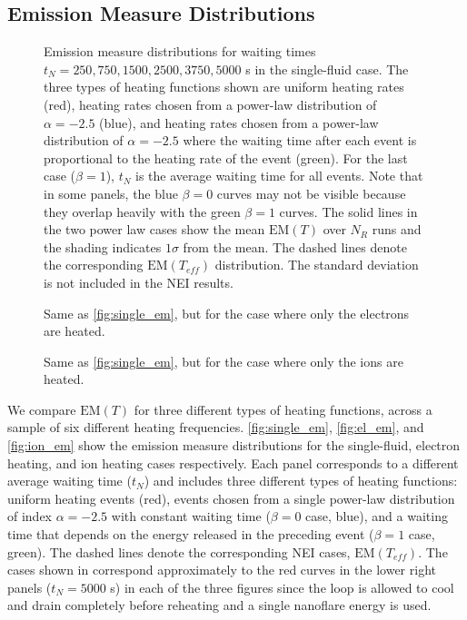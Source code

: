 \documentclass[preprint,linenumbers]{aastex}
\begin{document}
	\subsection{Emission Measure Distributions}
	\label{subsec:em_dist}
	\begin{figure*}[t]
		\caption{Emission measure distributions for waiting times $t_N=250,750,1500,2500,3750,5000$ s in the single-fluid case. The three types of heating functions shown are uniform heating rates (red), heating rates chosen from a power-law distribution of $\alpha=-2.5$ (blue), and heating rates chosen from a power-law distribution of $\alpha=-2.5$ where the waiting time after each event is proportional to the heating rate of the event (green). For the last case ($\beta=1$), $t_N$ is the average waiting time for all events. Note that in some panels, the blue $\beta=0$ curves may not be visible because they overlap heavily with the green $\beta=1$ curves. The solid lines in the two power law cases show the mean $\mathrm{EM}(T)$ over $N_R$ runs and the shading indicates $1\sigma$ from the mean. The dashed lines denote the corresponding $\mathrm{EM}(T_{eff})$ distribution. The standard deviation is not included in the NEI results.}
		\label{fig:single_em}
	\end{figure*}
	\begin{figure*}[t]
		\caption{Same as \autoref{fig:single_em}, but for the case where only the electrons are heated.}
		\label{fig:el_em}
	\end{figure*}
	\begin{figure*}
		\caption{Same as \autoref{fig:single_em}, but for the case where only the ions are heated.}
		\label{fig:ion_em}
	\end{figure*}
	\par We compare $\mathrm{EM}(T)$ for three different types of heating functions, across a sample of six different heating frequencies. \autoref{fig:single_em}, \autoref{fig:el_em}, and \autoref{fig:ion_em} show the emission measure distributions for the single-fluid, electron heating, and ion heating cases respectively. Each panel corresponds to a different average waiting time ($t_N$) and includes three different types of heating functions: uniform heating events (red), events chosen from a single power-law distribution of index $\alpha=-2.5$ with constant waiting time ($\beta=0$ case, blue), and a waiting time that depends on the energy released in the preceding event ($\beta=1$ case, green). The dashed lines denote the corresponding NEI cases, $\mathrm{EM}(T_{eff})$. The cases shown in  correspond approximately to the red curves in the lower right panels ($t_N=5000$ s) in each of the three figures since the loop is allowed to cool and drain completely before reheating and a single nanoflare energy is used. 
\end{document}
